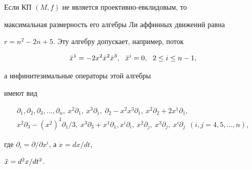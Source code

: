 \begin{thm}


Если КП $(M,f) $ не является проективно-евклидовым, то


максимальная размерность его алгебры Ли аффинных движений равна


$r=n^2-2n+5$. Эту алгебру допускает, например, поток


$$


\Ddot{x}^1=-2x^2\dot{x}^2\dot{x}^3,\ \ \Ddot{x}^i=0,\ \ 2\leq i\leq n-1,


$$


а инфинитезимальные операторы этой алгебры


имеют вид


\begin{gather*}


\partial_1,\partial_2,\partial_3,\dotsc,


\partial_n,\ x^2 \partial_1,\ x^3 \partial_1,\ \partial_2-x^2x^3


\partial_1,\


x^2 \partial_2+2x^1\partial_1,\\


x^2 \partial_3-(x^2)^3


\partial_1/3,\ x^3 \partial_3+ x^1 \partial_1,


x^i \partial_i,\ x^2 \partial_j,\ x^3 \partial_j,\ x^i \partial_j


\ \ (i,j=4,5,\dotsc,n),


\end{gather*}


где $\partial_i=\partial/\partial x^i$, а $\dot{x}=dx/dt$,


$\Ddot{x}=d^2x/dt^2$.


\end{thm}





